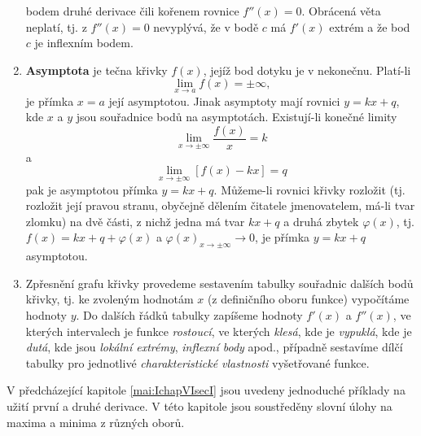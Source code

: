 \begin{enumerate}[noitemsep]
        bodem druhé derivace čili kořenem rovnice $f''(x)=0$. Obrácená věta neplatí, tj. z
        $f''(x)=0$ nevyplývá, že v bodě $c$ má $f'(x)$ extrém a že bod $c$ je inflexním bodem.
      \item \textbf{Asymptota} je tečna křivky \(f(x)\), jejíž bod dotyku je v nekonečnu. Platí-li  
        $$\lim_{x \to a}f(x) =  \pm\infty,$$ je přímka $x=a$ její asymptotou. Jinak asymptoty mají
        rovnici $y=kx+q$, kde \(x\) a \(y\) jsou souřadnice bodů na asymptotách. Existují-li konečné
        limity $$\lim_{x \to \pm\infty}\frac{f(x)}{x}=k$$  a $$\lim_{x \to \pm\infty}[f(x)-kx] =q$$
        pak je asymptotou přímka $y=kx+q$. Můžeme-li rovnici křivky rozložit (tj. rozložit její
        pravou stranu, oby\-čejně dělením čitatele jmenovatelem, má-li tvar zlomku) na dvě části, z
        nichž jedna má tvar $kx+q$ a druhá zbytek $\varphi(x)$, tj. $f(x)=kx+q+\varphi(x)$ a
        $\varphi(x)_{x\rightarrow \pm\infty}\rightarrow 0$, je přímka $y=kx+q$ asymptotou.
      \item Zpřesnění grafu křivky provedeme sestavením tabulky souřadnic dalších bodů křivky, tj.
        ke zvoleným hodnotám \(x\) (z definičního oboru funkce) vypočítáme hodnoty \(y\). Do dalších
        řádků tabulky zapíšeme hodnoty  $f'(x)$ a $f''(x)$, ve kterých intervalech je funkce
        \emph{rostoucí}, ve kterých \emph{klesá}, kde je \emph{vypuklá}, kde je \emph{dutá}, kde
        jsou \emph{lokální extrémy}, \emph{inflexní body} apod., případně sestavíme dílčí tabulky
        pro jednotlivé \emph{charakteristické vlastnosti} vyšetřované funkce.
    \end{enumerate}
    

    V předcházející kapitole \ref{mai:IchapVIsecI} jsou uvedeny jednoduché příklady na užití první a
    druhé derivace. V této kapitole jsou soustředěny slovní úlohy na maxima a minima z různých
    oborů.
    
    
    
